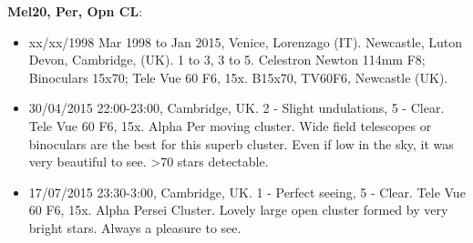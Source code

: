 {\bf Mel20, Per, Opn CL}:
\begin{itemize}
\item xx/xx/1998 Mar 1998 to Jan 2015, Venice, Lorenzago (IT). Newcastle, Luton Devon, Cambridge, (UK). 1 to 3, 3 to 5. Celestron Newton 114mm F8; Binoculars 15x70; Tele Vue 60 F6, 15x. B15x70, TV60F6, Newcastle (UK).
\item 30/04/2015 22:00-23:00, Cambridge, UK. 2 - Slight undulations, 5 - Clear. Tele Vue 60 F6, 15x. Alpha Per moving cluster. Wide field telescopes or binoculars are the best for this superb cluster. Even if low in the sky, it was very beautiful to see. >70 stars detectable.
\item 17/07/2015 23:30-3:00, Cambridge, UK. 1 - Perfect seeing, 5 - Clear. Tele Vue 60 F6, 15x. Alpha Persei Cluster. Lovely large open cluster formed by very bright stars. Always a pleasure to see.
\end{itemize}
